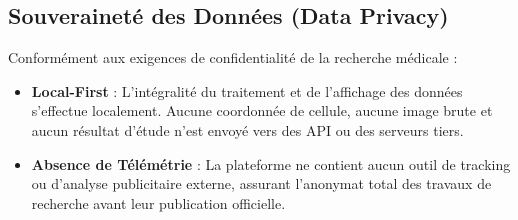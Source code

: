 \subsection{Souveraineté des Données (Data Privacy)}
Conformément aux exigences de confidentialité de la recherche médicale :
\begin{itemize}
    \item \textbf{Local-First} : L'intégralité du traitement et de l'affichage des données s'effectue localement. Aucune coordonnée de cellule, aucune image brute et aucun résultat d'étude n'est envoyé vers des API ou des serveurs tiers.
    \item \textbf{Absence de Télémétrie} : La plateforme ne contient aucun outil de tracking ou d'analyse publicitaire externe, assurant l'anonymat total des travaux de recherche avant leur publication officielle.
\end{itemize}
